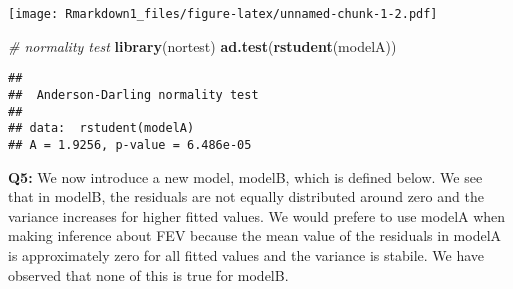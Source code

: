 \documentclass[]{article}
\newenvironment{Shaded}{\begin{snugshade}}{\end{snugshade}}
\newcommand{\KeywordTok}[1]{\textcolor[rgb]{0.13,0.29,0.53}{\textbf{#1}}}
\newcommand{\DataTypeTok}[1]{\textcolor[rgb]{0.13,0.29,0.53}{#1}}
\newcommand{\DecValTok}[1]{\textcolor[rgb]{0.00,0.00,0.81}{#1}}
\newcommand{\FloatTok}[1]{\textcolor[rgb]{0.00,0.00,0.81}{#1}}
\newcommand{\StringTok}[1]{\textcolor[rgb]{0.31,0.60,0.02}{#1}}
\newcommand{\CommentTok}[1]{\textcolor[rgb]{0.56,0.35,0.01}{\textit{#1}}}
\newcommand{\OtherTok}[1]{\textcolor[rgb]{0.56,0.35,0.01}{#1}}
\newcommand{\OperatorTok}[1]{\textcolor[rgb]{0.81,0.36,0.00}{\textbf{#1}}}
\newcommand{\NormalTok}[1]{#1}
\begin{document}
\texttt{[image: Rmarkdown1\_files/figure-latex/unnamed-chunk-1-2.pdf]}

\begin{Shaded}
\begin{Highlighting}[]
\CommentTok{# normality test}
\KeywordTok{library}\NormalTok{(nortest) }
\KeywordTok{ad.test}\NormalTok{(}\KeywordTok{rstudent}\NormalTok{(modelA))}
\end{Highlighting}
\end{Shaded}

\begin{verbatim}
## 
##  Anderson-Darling normality test
## 
## data:  rstudent(modelA)
## A = 1.9256, p-value = 6.486e-05
\end{verbatim}

\textbf{Q5:} We now introduce a new model, modelB, which is defined
below. We see that in modelB, the residuals are not equally distributed
around zero and the variance increases for higher fitted values. We
would prefere to use modelA when making inference about FEV because the
mean value of the residuals in modelA is approximately zero for all
fitted values and the variance is stabile. We have observed that none of
this is true for modelB.

\begin{Shaded}
\end{Shaded}
\end{document}
